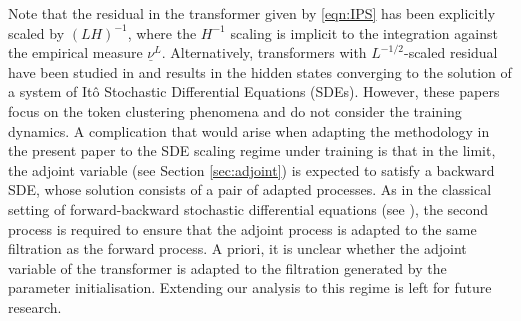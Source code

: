 \documentclass{article}
\begin{document}
Note that the residual in the transformer given by \eqref{eqn:IPS} has been explicitly scaled by $(LH)^{-1}$, where the $H^{-1}$ scaling is implicit to the integration against the empirical measure $\underline{\nu}^L$. Alternatively, transformers with $L^{-1/2}$-scaled residual have been studied in \cite{agazzi2026stochastic,fedorov2026clustering,koubbi2026homogenized} and results in the hidden states converging to the solution of a system of It\^o Stochastic Differential Equations (SDEs). However, these papers focus on the token clustering phenomena and do not consider the training dynamics. A complication that would arise when adapting the methodology in the present paper to the SDE scaling regime under training is that in the limit, the adjoint variable (see Section \ref{sec:adjoint}) is expected to satisfy a backward SDE, whose solution consists of a pair of adapted processes. As in the classical setting of forward-backward stochastic differential equations (see \cite{Ma2007}), the second process is required to ensure that the adjoint process is adapted to the same filtration as the forward process. A priori, it is unclear whether the adjoint variable of the transformer is adapted to the filtration generated by the parameter initialisation. 
Extending our analysis to this regime is left for future research.
\end{document}
